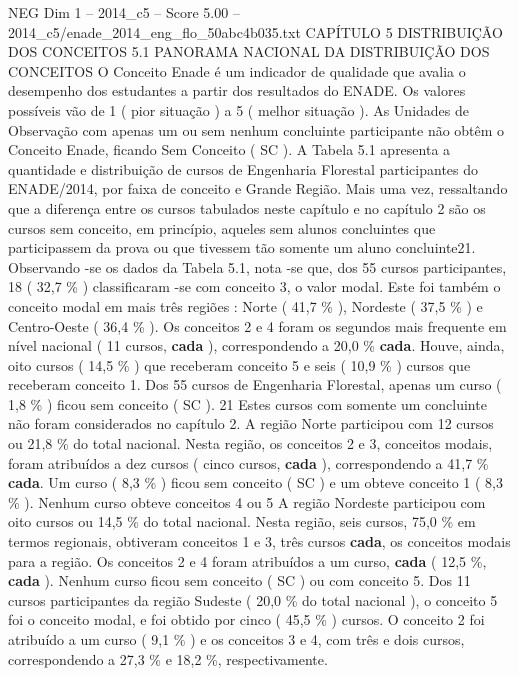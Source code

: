 \begin{textsample}{NEG Dim 1 – 2014\_c5 – Score 5.00 – 2014\_c5/enade\_2014\_eng\_flo\_50abc4b035.txt}  \label{ex:f1_neg_332}
CAPÍTULO 5 DISTRIBUIÇÃO DOS CONCEITOS 5.1 PANORAMA NACIONAL DA DISTRIBUIÇÃO DOS CONCEITOS O Conceito Enade é um indicador de qualidade que avalia o desempenho dos estudantes a partir dos resultados do ENADE.
Os valores possíveis vão de 1 ( pior situação ) a 5 ( melhor situação ).
As Unidades de Observação com apenas um ou sem nenhum concluinte participante não obtêm o Conceito Enade, ficando Sem Conceito ( SC ).
A Tabela 5.1 apresenta a quantidade e distribuição de cursos de Engenharia Florestal participantes do ENADE/2014, por faixa de conceito e Grande Região.
Mais uma vez, ressaltando que a diferença entre os cursos tabulados neste capítulo e no capítulo 2 são os cursos sem conceito, em princípio, aqueles sem alunos concluintes que participassem da prova ou que tivessem tão somente um aluno concluinte21.
Observando -se os dados da Tabela 5.1, nota -se que, dos 55 cursos participantes, 18 ( 32,7 \% ) classificaram -se com conceito 3, o valor modal.
Este foi também o conceito modal em mais três regiões : Norte ( 41,7 \% ), Nordeste ( 37,5 \% ) e Centro-Oeste ( 36,4 \% ).
Os conceitos 2 e 4 foram os segundos mais frequente em nível nacional ( 11 cursos, \textbf{cada} ), correspondendo a 20,0 \% \textbf{cada}.
Houve, ainda, oito cursos ( 14,5 \% ) que receberam conceito 5 e seis ( 10,9 \% ) cursos que receberam conceito 1.
Dos 55 cursos de Engenharia Florestal, apenas um curso ( 1,8 \% ) ficou sem conceito ( SC ). 21 Estes cursos com somente um concluinte não foram considerados no capítulo 2.
A região Norte participou com 12 cursos ou 21,8 \% do total nacional.
Nesta região, os conceitos 2 e 3, conceitos modais, foram atribuídos a dez cursos ( cinco cursos, \textbf{cada} ), correspondendo a 41,7 \% \textbf{cada}.
Um curso ( 8,3 \% ) ficou sem conceito ( SC ) e um obteve conceito 1 ( 8,3 \% ).
Nenhum curso obteve conceitos 4 ou 5 A região Nordeste participou com oito cursos ou 14,5 \% do total nacional.
Nesta região, seis cursos, 75,0 \% em termos regionais, obtiveram conceitos 1 e 3, três cursos \textbf{cada}, os conceitos modais para a região.
Os conceitos 2 e 4 foram atribuídos a um curso, \textbf{cada} ( 12,5 \%, \textbf{cada} ).
Nenhum curso ficou sem conceito ( SC ) ou com conceito 5.
Dos 11 cursos participantes da região Sudeste ( 20,0 \% do total nacional ), o conceito 5 foi o conceito modal, e foi obtido por cinco ( 45,5 \% ) cursos.
O conceito 2 foi atribuído a um curso ( 9,1 \% ) e os conceitos 3 e 4, com três e dois cursos, correspondendo a 27,3 \% e 18,2 \%, respectivamente.

\end{textsample}
